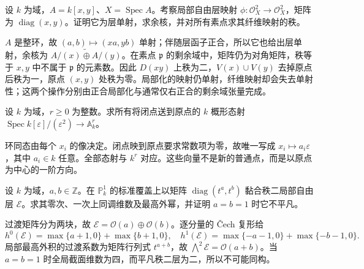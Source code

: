 \begin{optionalexercise}\label{b3:ex:24-ideal-sheaf-fiber}
	设 \(k\) 为域，\(A=k[x,y]\)、\(X=\operatorname{Spec}A\)。考察局部自由层映射 \(\phi:\mathcal O_X^2\to\mathcal O_X^2\)，矩阵为 \(\operatorname{diag}(x,y)\)。证明它为层单射，求余核，并对所有素点求其纤维映射的秩。
\end{optionalexercise}
\begin{solution}
	\(A\) 是整环，故 \((a,b)\mapsto(xa,yb)\) 单射；伴随层函子正合，所以它也给出层单射，余核为 \(\widetilde{A/(x)\oplus A/(y)}\)。在素点 \(\mathfrak p\) 的剩余域中，矩阵仍为对角矩阵，秩等于 \(x,y\) 中不属于 \(\mathfrak p\) 的元素数。因此 \(D(xy)\) 上秩为二，\(V(x)\cup V(y)\) 去掉原点后秩为一，原点 \((x,y)\) 处秩为零。局部化的映射仍单射，纤维映射却会失去单射性；这两个操作分别由正合局部化与通常仅右正合的剩余域张量完成。
\end{solution}

\begin{optionalexercise}\label{b3:ex:24-dual-number-tangent-map}
	设 \(k\) 为域，\(r\ge0\) 为整数。求所有将闭点送到原点的 \(k\) 概形态射 \(\operatorname{Spec}k[\varepsilon]/(\varepsilon^2)\rightarrow\mathbb A_k^r\)。
\end{optionalexercise}
\begin{solution}
	环同态由每个 \(x_i\) 的像决定。闭点映到原点要求常数项为零，故唯一写成 \(x_i\mapsto a_i\varepsilon\)，其中 \(a_i\in k\) 任意。全部态射与 \(k^r\) 对应。这些向量不是新的普通点，而是以原点为中心的一阶方向。
\end{solution}

\begin{optionalexercise}\label{b3:ex:24-split-vector-bundle}
	设 \(k\) 为域，\(a,b\in\mathbb Z\)。在 \(\mathbb P_k^1\) 的标准覆盖上以矩阵 \(\operatorname{diag}(t^a,t^b)\) 黏合秩二局部自由层 \(\mathcal E\)。求其零次、一次上同调维数及最高外幂，并证明 \(a=b=1\) 时它不平凡。
\end{optionalexercise}
\begin{solution}
	过渡矩阵分为两块，故 \(\mathcal E=\mathcal O(a)\oplus\mathcal O(b)\)。逐分量的 Čech 复形给
	\[
		h^0(\mathcal E)=\max\{a+1,0\}+\max\{b+1,0\},\quad h^1(\mathcal E)=\max\{-a-1,0\}+\max\{-b-1,0\}.
	\]
	局部最高外积的过渡系数为矩阵行列式 \(t^{a+b}\)，故 \(\bigwedge^2\mathcal E=\mathcal O(a+b)\)。当 \(a=b=1\) 时全局截面维数为四，而平凡秩二层为二，所以不可能同构。
\end{solution}

